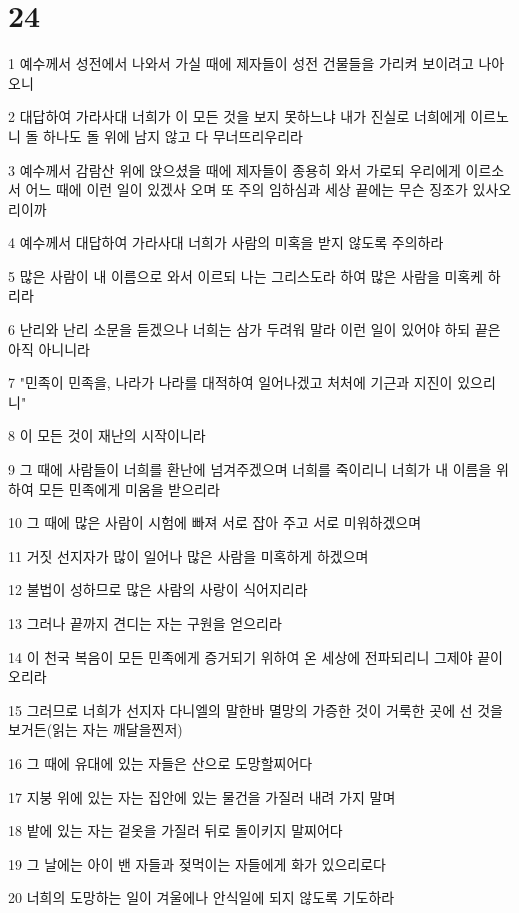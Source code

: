 \chapter{24}

\par 1 예수께서 성전에서 나와서 가실 때에 제자들이 성전 건물들을 가리켜 보이려고 나아오니
\par 2 대답하여 가라사대 너희가 이 모든 것을 보지 못하느냐 내가 진실로 너희에게 이르노니 돌 하나도 돌 위에 남지 않고 다 무너뜨리우리라
\par 3 예수께서 감람산 위에 앉으셨을 때에 제자들이 종용히 와서 가로되 우리에게 이르소서 어느 때에 이런 일이 있겠사 오며 또 주의 임하심과 세상 끝에는 무슨 징조가 있사오리이까
\par 4 예수께서 대답하여 가라사대 너희가 사람의 미혹을 받지 않도록 주의하라
\par 5 많은 사람이 내 이름으로 와서 이르되 나는 그리스도라 하여 많은 사람을 미혹케 하리라
\par 6 난리와 난리 소문을 듣겠으나 너희는 삼가 두려워 말라 이런 일이 있어야 하되 끝은 아직 아니니라
\par 7 "민족이 민족을, 나라가 나라를 대적하여 일어나겠고 처처에 기근과 지진이 있으리니"
\par 8 이 모든 것이 재난의 시작이니라
\par 9 그 때에 사람들이 너희를 환난에 넘겨주겠으며 너희를 죽이리니 너희가 내 이름을 위하여 모든 민족에게 미움을 받으리라
\par 10 그 때에 많은 사람이 시험에 빠져 서로 잡아 주고 서로 미워하겠으며
\par 11 거짓 선지자가 많이 일어나 많은 사람을 미혹하게 하겠으며
\par 12 불법이 성하므로 많은 사람의 사랑이 식어지리라
\par 13 그러나 끝까지 견디는 자는 구원을 얻으리라
\par 14 이 천국 복음이 모든 민족에게 증거되기 위하여 온 세상에 전파되리니 그제야 끝이 오리라
\par 15 그러므로 너희가 선지자 다니엘의 말한바 멸망의 가증한 것이 거룩한 곳에 선 것을 보거든(읽는 자는 깨달을찐저)
\par 16 그 때에 유대에 있는 자들은 산으로 도망할찌어다
\par 17 지붕 위에 있는 자는 집안에 있는 물건을 가질러 내려 가지 말며
\par 18 밭에 있는 자는 겉옷을 가질러 뒤로 돌이키지 말찌어다
\par 19 그 날에는 아이 밴 자들과 젖먹이는 자들에게 화가 있으리로다
\par 20 너희의 도망하는 일이 겨울에나 안식일에 되지 않도록 기도하라
